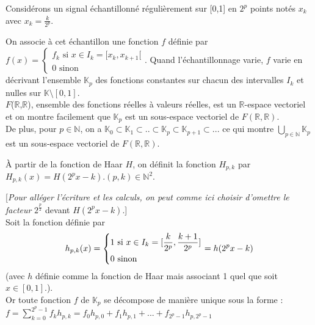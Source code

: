 \documentclass{article}
\begin{document}
Considérons un signal échantillonné régulièrement sur [0,1] en $2^p$ points notés $x_{k}$ avec $x_{k} = \frac{k}{2^p}$.

On associe à cet échantillon une fonction $f$ définie par $f(x) = \begin{cases}
     f_{k} \text{ si } x \in I_{k} = [x_{k},x_{k+1}[\\
     0 \text{ sinon }
   \end{cases}$.
Quand l'échantillonnage varie, $f$ varie en décrivant l'ensemble $\mathbb{K}_{p}$ des fonctions constantes sur chacun des intervalles $I_{k}$ et nulles sur $\mathbb{K} \setminus [0,1]$. \\

$F$($\mathbb{R}$,$\mathbb{R}$), ensemble des fonctions réelles à valeurs réelles, est un $\mathbb{R}$-espace vectoriel et on montre facilement que $\mathbb{K}_{p}$ est un sous-espace vectoriel de $F(\mathbb{R},\mathbb{R})$. \\

De plus, pour $p \in \mathbb{N}$, on a $\mathbb{K}_{0} \subset \mathbb{K}_{1} \subset .. \subset \mathbb{K}_{p} \subset \mathbb{K}_{p+1} \subset ... $ ce qui montre $\bigcup\limits_{p \in \mathbb{N}}\mathbb{K}_{p}$ est un sous-espace vectoriel de $F(\mathbb{R},\mathbb{R})$.

\uppercase{à} partir de la fonction de Haar $H$, on définit la fonction $H_{p,k}$ par $H_{p,k}(x) = H(2^{p}x - k). (p,k) \in \mathbb{N}^2$.

[\textit{Pour alléger l’écriture et les calculs, on peut comme ici choisir d’omettre le facteur }$2^\frac{p}{2}$ devant $ H(2^{p}x - k)$.] \\

Soit la fonction définie par \[
 h_{p,k}(x) = \begin{dcases*}
        1 \text{ si } x \in I_{k} = [\frac{k}{2^p},\frac{k+1}{2^p}] \\ 
        0 \text{ sinon }
        \end{dcases*}
 = h(2^{p}x - k) \] (avec $h$ définie comme la fonction de Haar mais associant 1 quel que soit $x \in [0,1]$.). \\

Or toute fonction $f$ de $\mathbb{K}_{p}$ se décompose de manière unique sous la forme : \\

$\displaystyle f = \sum_{k = 0}^{2^p - 1} f_{k}h_{p,k} = f_{0}h_{p,0} + f_{1}h_{p,1} + ... + f_{2^p - 1}h_{p,2^p - 1}$ \\
\end{document}
